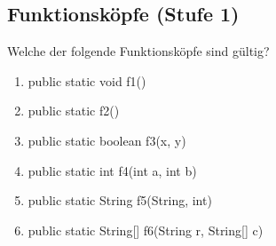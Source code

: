\subsection{Funktionsköpfe (Stufe 1)}
Welche der folgende Funktionsköpfe sind gültig?
\begin{multicols}{2}
    \begin{enumerate}\small
        \item public static void f1()
        \item public static f2()
        \item public static boolean f3(x, y)
        \item public static int f4(int a, int b)
        \item public static String f5(String, int)
        \item public static String[] f6(String r, String[] c)
    \end{enumerate}
\end{multicols}
